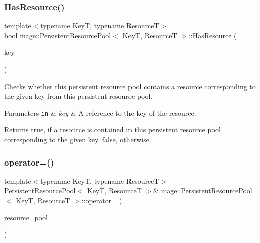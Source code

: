 \subsubsection{\texorpdfstring{Has\+Resource()}{HasResource()}}
{\footnotesize\ttfamily template$<$typename KeyT, typename ResourceT$>$ \\
bool \hyperlink{classmage_1_1_persistent_resource_pool}{mage\+::\+Persistent\+Resource\+Pool}$<$ KeyT, ResourceT $>$\+::Has\+Resource (\begin{DoxyParamCaption}\item[{const KeyT \&}]{key }\end{DoxyParamCaption})\hspace{0.3cm}{\ttfamily [noexcept]}}

Checks whether this persistent resource pool contains a resource corresponding to the given key from this persistent resource pool.


\begin{DoxyParams}[1]{Parameters}
\mbox{\tt in}  & {\em key} & A reference to the key of the resource. \\
\hline
\end{DoxyParams}
\begin{DoxyReturn}{Returns}
{\ttfamily true}, if a resource is contained in this persistent resource pool corresponding to the given key. {\ttfamily false}, otherwise. 
\end{DoxyReturn}
\hypertarget{classmage_1_1_persistent_resource_pool_a14b9be5f6ac88941b12a3d63a9e6e127}{}\label{classmage_1_1_persistent_resource_pool_a14b9be5f6ac88941b12a3d63a9e6e127} 
\subsubsection{\texorpdfstring{operator=()}{operator=()}\hspace{0.1cm}{\footnotesize\ttfamily [1/2]}}
{\footnotesize\ttfamily template$<$typename KeyT, typename ResourceT$>$ \\
\hyperlink{classmage_1_1_persistent_resource_pool}{Persistent\+Resource\+Pool}$<$ KeyT, ResourceT $>$\& \hyperlink{classmage_1_1_persistent_resource_pool}{mage\+::\+Persistent\+Resource\+Pool}$<$ KeyT, ResourceT $>$\+::operator= (\begin{DoxyParamCaption}\item[{const \hyperlink{classmage_1_1_persistent_resource_pool}{Persistent\+Resource\+Pool}$<$ KeyT, ResourceT $>$ \&}]{resource\+\_\+pool }\end{DoxyParamCaption})\hspace{0.3cm}{\ttfamily [delete]}}

